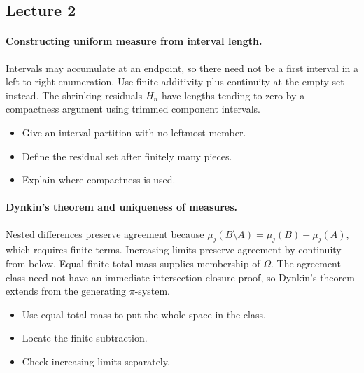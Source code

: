 \documentclass[11pt,letterpaper]{article}
\begin{document}
\subsection{Lecture 2}
\hypertarget{answer-l2-s2}{}\paragraph{Constructing uniform measure from interval length.}
Intervals may accumulate at an endpoint, so there need not be a first interval in a left-to-right enumeration. Use finite additivity plus continuity at the empty set instead. The shrinking residuals $H_n$ have lengths tending to zero by a compactness argument using trimmed component intervals.
\begin{itemize}
\item Give an interval partition with no leftmost member.
\item Define the residual set after finitely many pieces.
\item Explain where compactness is used.
\end{itemize}
\hypertarget{answer-l2-s5}{}\paragraph{Dynkin's theorem and uniqueness of measures.}
Nested differences preserve agreement because $\mu_j(B\setminus A)=\mu_j(B)-\mu_j(A)$, which requires finite terms. Increasing limits preserve agreement by continuity from below. Equal finite total mass supplies membership of $\Omega$. The agreement class need not have an immediate intersection-closure proof, so Dynkin's theorem extends from the generating $\pi$-system.
\begin{itemize}
\item Use equal total mass to put the whole space in the class.
\item Locate the finite subtraction.
\item Check increasing limits separately.
\end{itemize}
\end{document}
